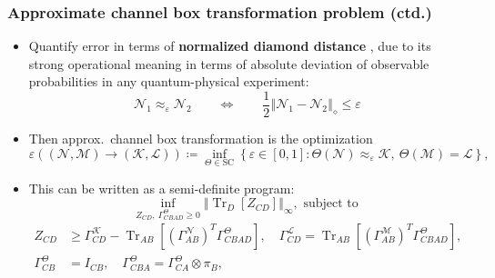 \documentclass[usenames,dvipsnames,handout]{beamer}
\begin{document}
\begin{frame}
\frametitle{Approximate channel box transformation problem (ctd.)}

\begin{itemize}

\pause
\item Quantify error in terms of {\color{MidnightBlue}\textbf{normalized diamond distance}} \cite{Kitaev1997}, due to its strong operational meaning in terms of absolute deviation of observable probabilities in any quantum-physical experiment:
$$
\mathcal{N}_1 \approx_{\varepsilon} \mathcal{N}_2 \qquad \Longleftrightarrow \qquad \frac{1}{2} \left \Vert \mathcal{N}_1 - \mathcal{N}_2 \right \Vert_{\diamond} \leq \varepsilon
$$

\pause
\vspace{.1in}
\item Then approx.~channel box transformation is the optimization
$$
\varepsilon((\mathcal{N},\mathcal{M})\rightarrow(\mathcal{K},\mathcal{L}
))\coloneqq 
\inf_{\Theta\in\text{SC}}\left\{  \varepsilon\in\left[  0,1\right]
:\Theta(\mathcal{N})\approx_{\varepsilon}\mathcal{K},\ \Theta(\mathcal{M})=\mathcal{L}\right\}  ,
$$

\pause
\vspace{.1in}
\item This can be written as a semi-definite program:
\begin{equation*}
\inf_{Z_{CD},\ \Gamma_{CBAD}^{\Theta}\geq0}\left\Vert \operatorname{Tr}%
_{D}[Z_{CD}]\right\Vert _{\infty}, \label{eq:SDP-primal-box-tr-1} \text{ subject to }
\end{equation*}
\begin{align*}
Z_{CD}  &  \geq\Gamma_{CD}^{\mathcal{K}}-\operatorname{Tr}_{AB}[(\Gamma
_{AB}^{\mathcal{N}})^{T}\Gamma_{CBAD}^{\Theta}],\quad 
\Gamma_{CD}^{\mathcal{L}}    =\operatorname{Tr}_{AB}[(\Gamma_{AB}%
^{\mathcal{M}})^{T}\Gamma_{CBAD}^{\Theta}],\nonumber\\
\Gamma_{CB}^{\Theta}  &  =I_{CB},\quad
\Gamma_{CBA}^{\Theta}    =\Gamma_{CA}^{\Theta}\otimes\pi_{B},
\label{eq:SDP-primal-box-tr-2}%
\end{align*}


\end{itemize}


\end{frame}
\end{document}
